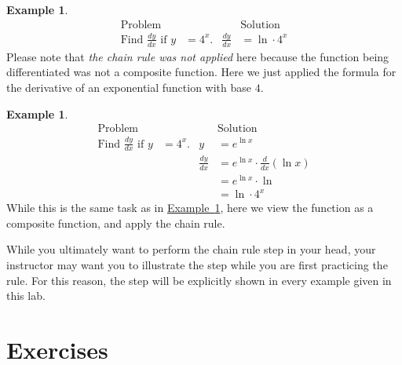 \documentclass[12pt,]{book}
\theoremstyle{plain}
\theoremstyle{definition}
\newtheorem{example}[theorem]{Example}
\numberwithin{equation}{section}
\newcommand{\fe}[2]{\mathop{{#1}{\left(#2\right)}}}
\newcommand{\lz}[2]{\frac{d#1}{d#2}}
\newcommand{\lzoo}[2]{{\frac{d}{d#1}}{\left(#2\right)}}
\begin{document}
\begin{example}\label{example-third-chain-rule}
\begin{align*}
\text{Problem}&&&\text{Solution}\\
\text{Find }\lz{y}{x}\text{ if }y&=4^x\text{.}&\lz{y}{x}&=\fe{\ln}{4}\cdot4^x
\end{align*}Please note that \emph{the chain rule was not applied} here because the function being differentiated was not a composite function. Here we just applied the formula for the derivative of an exponential function with base \(4\).%
\end{example}
\begin{example}\label{example-fourth-chain-rule}
\begin{align*}
\text{Problem}&&&\text{Solution}\\
\text{Find }\lz{y}{x}\text{ if }y&=4^x\text{.}&y&=e^{\fe{\ln}{4}x}\\
&&\lz{y}{x}&=e^{\fe{\ln}{4}x}\cdot\lzoo{x}{\fe{\ln}{4}x}\\
&&&=e^{\fe{\ln}{4}x}\cdot\fe{\ln}{4}\\
&&&=\fe{\ln}{4}\cdot4^{x}
\end{align*}While this is the same task as in \hyperref[example-third-chain-rule]{Example~\ref*{example-third-chain-rule}}, here we view the function as a composite function, and apply the chain rule.%
\end{example}
\par
While you ultimately want to perform the chain rule step in your head, your instructor may want you to illustrate the step while you are first practicing the rule.  For this reason, the step will be explicitly shown in every example given in this lab.%
\typeout{************************************************}
\typeout{************************************************}
\section*{Exercises}\label{exercises-40}
\end{document}

